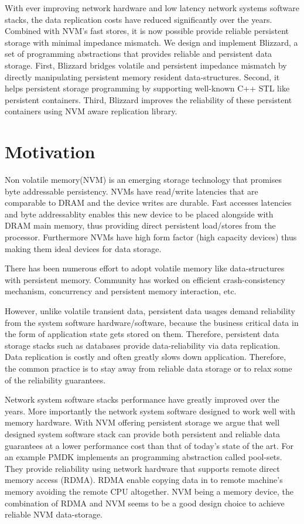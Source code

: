 With ever improving network hardware and low latency network systems software stacks, 
the data replication costs have reduced significantly over the years. Combined with NVM's
fast stores, it is now possible provide reliable persistent storage with minimal impedance
mismatch. We design and implement Blizzard, a set of programming abstractions that provides 
reliable and persistent data storage. First, Blizzard bridges volatile and persistent impedance
mismatch by directly manipulating persistent memory resident data-structures. Second, it helps
persistent storage programming by supporting well-known C++ STL like persistent containers.
Third, Blizzard improves the reliability of these persistent containers using NVM aware replication library.


\section{Motivation}
Non volatile memory(NVM) is an emerging storage technology that promises byte addressable 
persistency. NVMs have read/write latencies that are comparable to DRAM and the device 
writes are durable. Fast accesses latencies and byte addressablity enables this new device
to be placed alongside with DRAM main memory, thus providing direct persistent load/stores
from the processor. Furthermore NVMs have high form factor (high capacity devices) thus
making them ideal devices for data storage. 

There has been numerous effort to adopt volatile memory like data-structures with persistent
memory. Community has worked on efficient crash-consistency mechanism, concurrency and persistent
memory interaction, etc. 

However, unlike volatile transient data, persistent data usages
demand reliability from the system software hardware/software, because the business critical data
in the form of application state gets stored on them. Therefore, persistent data storage stacks such
as databases provide data-reliability via data replication. Data replication is costly and often
greatly slows down application. Therefore, the common practice is to stay away from reliable data
storage or to relax some of the reliability guarantees.

Network system software stacks performance have greatly improved over the years. More importantly
the network system software designed to work well with memory hardware. With NVM offering persistent
storage we argue that well designed system software stack can provide both persistent and reliable
data guarantees at a lower performance cost than that of today's state of the art. For an example
PMDK implements an programming abstraction called pool-sets. They provide reliability using network
hardware that supports remote direct memory access (RDMA). RDMA enable copying data in to remote
machine's memory avoiding the remote CPU altogether. NVM being a memory device, the combination of
RDMA and NVM seems to be a good design choice to achieve reliable NVM data-storage.

